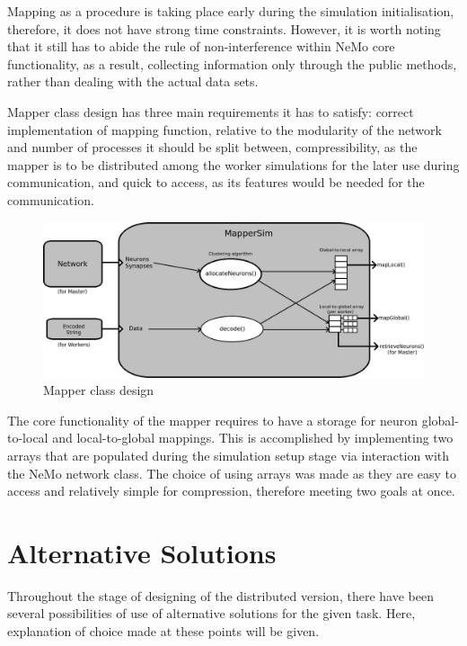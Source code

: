 Mapping as a procedure is taking place early during the simulation initialisation, therefore, it does not have strong time constraints. However, it is worth noting that it still has to abide the rule of non-interference within NeMo core functionality, as a result, collecting information only through the public methods, rather than dealing with the actual data sets.

Mapper class design has three main requirements it has to satisfy: correct implementation of mapping function, relative to the modularity of the network and number of processes it should be split between, compressibility, as the mapper is to be distributed among the worker simulations for the later use during communication, and quick to access, as its features would be needed for the communication.

\begin{figure}[h]
\begin{center}
\includegraphics[scale = 0.4]{images/design/mapper_design.png}
\end{center}
\caption{Mapper class design}
\end{figure}

The core functionality of the mapper requires to have a storage for neuron global-to-local and local-to-global mappings. This is accomplished by implementing two arrays that are populated during the simulation setup stage via interaction with the NeMo network class. The choice of using arrays was made as they are easy to access and relatively simple for compression, therefore meeting two goals at once.

\section{Alternative Solutions}

Throughout the stage of designing of the distributed version, there have been several possibilities of use of alternative solutions for the given task. Here, explanation of choice made at these points will be given.

